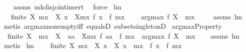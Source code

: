 \begin{isabellebody}
%
\isadelimproof
\ \ %
\endisadelimproof
%
\isatagproof
{}\isamarkupfalse%
\ assms\ mk{\isacharunderscore}disjoint{\isacharunderscore}insert\ \isamarkupfalse%
\ force%
\endisatagproof
{\isafoldproof}%
%
\isadelimproof
\isanewline
%
\endisadelimproof
\isanewline
{}\isamarkupfalse%
\ lm{}{}{}{\isacharcolon}\ \isanewline
\ \ \ {\isachardoublequoteopen}finite\ X{\isachardoublequoteclose}\ {\isachardoublequoteopen}mx\ {\isasymin}\ X{\isachardoublequoteclose}\ {\isachardoublequoteopen}{\isasymforall}x\ {\isasymin}\ X{\isacharminus}{\isacharbraceleft}mx{\isacharbraceright}{\isachardot}\ f\ x\ {\isacharless}\ f\ mx{\isachardoublequoteclose}\ \isanewline
\ \ \ {\isachardoublequoteopen}argmax\ f\ X\ {\isacharequal}\ {\isacharbraceleft}mx{\isacharbraceright}{\isachardoublequoteclose}\ \isanewline
%
\isadelimproof
\ \ %
\endisadelimproof
%
\isatagproof
{}\isamarkupfalse%
\ assms\ lm{}{}{}\ \isamarkupfalse%
\ {\isacharparenleft}metis\ argmax{\isacharunderscore}non{\isacharunderscore}empty{\isacharunderscore}iff\ equals{}D\ subset{\isacharunderscore}singletonD{\isacharparenright}%
\endisatagproof
{\isafoldproof}%
%
\isadelimproof
\isanewline
%
\endisadelimproof
\isanewline
\isanewline
{}\isamarkupfalse%
\ argmaxProperty{\isacharcolon}\ \isanewline
\ \ {\isachardoublequoteopen}{\isacharparenleft}finite\ X\ {\isacharampersand}\ mx\ {\isasymin}\ X\ {\isacharampersand}\ {\isacharparenleft}{\isasymforall}aa\ {\isasymin}\ X{\isacharminus}{\isacharbraceleft}mx{\isacharbraceright}{\isachardot}\ f\ aa\ {\isacharless}\ f\ mx{\isacharparenright}{\isacharparenright}\ {\isasymlongrightarrow}\ argmax\ f\ X\ {\isacharequal}\ {\isacharbraceleft}mx{\isacharbraceright}{\isachardoublequoteclose}\isanewline
%
\isadelimproof
\ \ %
\endisadelimproof
%
\isatagproof
{}\isamarkupfalse%
\ assms\ lm{}{}{}\ \isamarkupfalse%
\ metis%
\endisatagproof
{\isafoldproof}%
%
\isadelimproof
\isanewline
%
\endisadelimproof
\isanewline
{}\isamarkupfalse%
\ lm{}{}{}{\isacharcolon}\ \isanewline
\ \ \ {\isachardoublequoteopen}finite\ X{\isachardoublequoteclose}\ {\isachardoublequoteopen}mx\ {\isasymin}\ X{\isachardoublequoteclose}\ {\isachardoublequoteopen}{\isasymforall}x\ {\isasymin}\ X{\isachardot}\ x\ {\isasymnoteq}\ mx\ {\isasymlongrightarrow}\ f\ x\ {\isacharless}\ f\ mx{\isachardoublequoteclose}\ \isanewline

\end{isabellebody}
